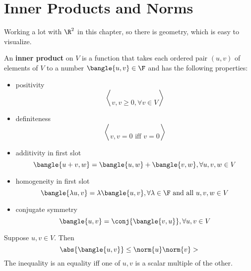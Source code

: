 \section{Inner Products and Norms}

Working a lot with $\R^2$ in this chapter, so there is geometry, which is easy to visualize.

\begin{definition}
  An \textbf{inner product} on $V$ is a function that takes each ordered pair $(u, v)$ of elements of $V$ to a number $\bangle{u, v} \in \F$ and has the following properties:
  \begin{itemize}
    \item positivity
          \begin{equation}
            \bangle{v, v} \geq 0, \forall v \in V
          \end{equation}
    \item definiteness
          \begin{equation}
            \bangle{v, v} = 0 \text{ iff } v = 0
          \end{equation}
    \item additivity in first slot
          \begin{equation}
            \bangle{u + v, w} = \bangle{u, w} + \bangle{v, w}, \forall u, v, w \in V
          \end{equation}
    \item homogeneity in first slot
          \begin{equation}
            \bangle{\lambda u, v} = \lambda \bangle{u, v}, \forall \lambda \in \F \text{ and all } u, v, w \in V
          \end{equation}
    \item conjugate symmetry
          \begin{equation}
            \bangle{u, v} = \conj{\bangle{v, u}}, \forall u, v \in V
          \end{equation}
  \end{itemize}
\end{definition}

\begin{theorem}
  Suppose $u, v \in V$. Then
  \begin{equation}
    \abs{
      \bangle{u, v}
    } \leq \norm{u}\norm{v}>
  \end{equation}
  The inequality is an equality iff one of $u, v$ is a scalar multiple of the other.
\end{theorem}


